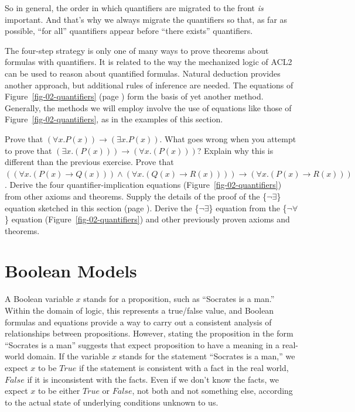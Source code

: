 {So in general, the order in which quantifiers are migrated to the front \emph{is}
important. And that's why we always migrate the quantifiers so that, as far as
possible, ``for all'' quantifiers appear before ``there exists'' quantifiers.

The four-step strategy is only one of many ways to prove theorems about
formulas with quantifiers. It is related to the way
the mechanized logic of ACL2 can be used to reason about quantified formulas.
Natural deduction provides another approach, but additional rules of inference
are needed.
The equations of Figure~\ref{fig-02-quantifiers} (page \pageref{fig-02-quantifiers})
form the basis of yet another method.
Generally, the methods we will employ involve the use of equations
like those of Figure~\ref{fig-02-quantifiers}, as in the examples
of this section.

\begin{ExerciseList}
\Exercise Prove that $(\forall x.P(x)) \rightarrow (\exists x.P(x))$.
\Exercise What goes wrong when you attempt to prove that $(\exists x.(P(x))) \rightarrow (\forall x.(P(x)))$?
Explain why this is different than the previous exercise.
\Exercise Prove that $((\forall x.(P(x) \rightarrow Q(x))) \wedge (\forall x.(Q(x) \rightarrow R(x)))) \rightarrow (\forall x.(P(x) \rightarrow R(x)))$.
\Exercise Derive the four quantifier-implication equations (Figure~\ref{fig-02-quantifiers})
from other axioms and theorems.
\Exercise Supply the details of the proof of the \{$\neg\exists$\} equation sketched in this section
(page \pageref{why-neg-forall}).
\Exercise Derive the \{$\neg\exists$\} equation from the \{$\neg\forall$\} equation
(Figure~\ref{fig-02-quantifiers}) and
other previously proven axioms and theorems.

\end{ExerciseList}


\section{Boolean Models}
\label{sec:boolean-models}

A Boolean variable $x$ 
stands for a proposition, such as ``Socrates is a man.''
Within the domain of logic, this represents a true/false value,
and Boolean formulas and equations provide a way to carry out
a consistent analysis of relationships between propositions.
However, stating the proposition in the form ``Socrates is a man''
suggests that expect proposition to have a meaning in a real-world domain.
If the variable $x$ stands for the statement ``Socrates is a man,''
we expect $x$ to be $True$ if the statement is consistent with a fact
in the real world, $False$ if it is inconsistent with the facts.
Even if we don't know the facts, we expect $x$ to be either $True$ or $False$,
not both and not something else,
according to the actual state of underlying conditions unknown to us.

}
